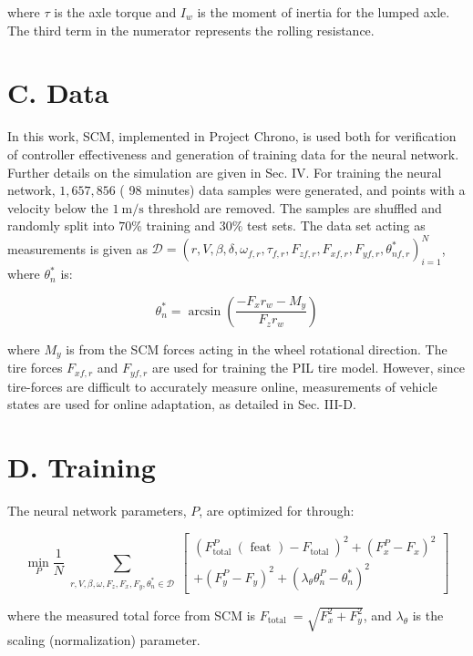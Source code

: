 \documentclass[10pt]{article}
\begin{document}
where $\tau$ is the axle torque and $I_{w}$ is the moment of inertia for the lumped axle. The third term in the numerator represents the rolling resistance.

\section*{C. Data}
In this work, SCM, implemented in Project Chrono, is used both for verification of controller effectiveness and generation of training data for the neural network. Further details on the simulation are given in Sec. IV. For training the neural network, $1,657,856$ ( 98 minutes) data samples were generated, and points with a velocity below the $1 \mathrm{~m} / \mathrm{s}$ threshold are removed. The samples are shuffled and randomly split into $70 \%$ training and $30 \%$ test sets. The data set acting as measurements is given as $\mathcal{D}= \left(r, V, \beta, \delta, \omega_{f, r}, \tau_{f, r}, F_{z f, r}, F_{x f, r}, F_{y f, r}, \theta_{n f, r}^{*}\right)_{i=1}^{N}$, where $\theta_{n}^{*}$ is:


\begin{equation*}
\theta_{n}^{*}=\arcsin \left(\frac{-F_{x} r_{w}-M_{y}}{F_{z} r_{w}}\right) \tag{10}
\end{equation*}


where $M_{y}$ is from the SCM forces acting in the wheel rotational direction. The tire forces $F_{x f, r}$ and $F_{y f, r}$ are used for training the PIL tire model. However, since tire-forces are difficult to accurately measure online, measurements of vehicle states are used for online adaptation, as detailed in Sec. III-D.

\section*{D. Training}
The neural network parameters, $P$, are optimized for through:

$$
\min _{P} \frac{1}{N} \sum_{\substack{r, V, \beta, \omega, F_{z}, F_{x}, F_{y}, \theta_{n}^{*} \in \mathcal{D}}}\left[\begin{array}{l}
\left(F_{\text {total }}^{P}(\text { feat })-F_{\text {total }}\right)^{2}+\left(F_{x}^{P}-F_{x}\right)^{2} \\
+\left(F_{y}^{P}-F_{y}\right)^{2}+\left(\lambda_{\theta} \theta_{n}^{P}-\theta_{n}^{*}\right)^{2}
\end{array}\right]
$$

where the measured total force from SCM is $F_{\text {total }}= \sqrt{F_{x}^{2}+F_{y}^{2}}$, and $\lambda_{\theta}$ is the scaling (normalization) parameter.
\end{document}
